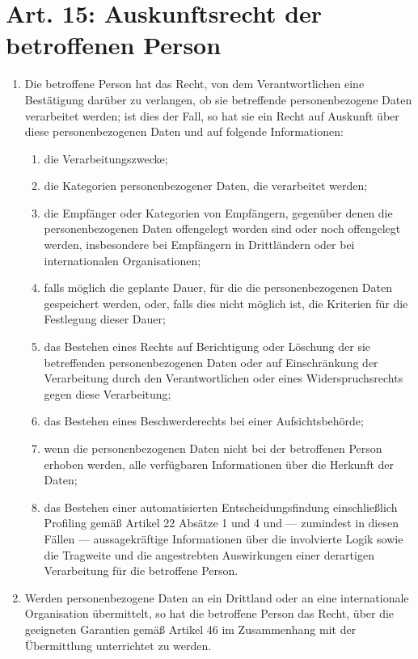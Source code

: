 \documentclass[A4, 12pt]{scrbook}
\begin{document}
    \section[Art. 15: Auskunftsrecht]{Art. 15: Auskunftsrecht der betroffenen Person}
        \begin{enumerate}[label=(\arabic*)]
            \item Die betroffene Person hat das Recht, von dem Verantwortlichen eine Bestätigung darüber zu verlangen, ob sie betreffende personenbezogene Daten verarbeitet werden; ist dies der Fall, so hat sie ein Recht auf Auskunft über diese personenbezogenen Daten und auf folgende Informationen:
                \begin{enumerate}[label=\alph*)]
                    \item die Verarbeitungszwecke;
                    \item die Kategorien personenbezogener Daten, die verarbeitet werden;
                    \item die Empfänger oder Kategorien von Empfängern, gegenüber denen die personenbezogenen Daten offengelegt worden sind oder noch offengelegt werden, insbesondere bei Empfängern in Drittländern oder bei internationalen Organisationen;
                    \item falls möglich die geplante Dauer, für die die personenbezogenen Daten gespeichert werden, oder, falls dies nicht möglich ist, die Kriterien für die Festlegung dieser Dauer;
                    \item das Bestehen eines Rechts auf Berichtigung oder Löschung der sie betreffenden personenbezogenen Daten oder auf Einschränkung der Verarbeitung durch den Verantwortlichen oder eines Widerspruchsrechts gegen diese Verarbeitung;
                    \item das Bestehen eines Beschwerderechts bei einer Aufsichtsbehörde;
                    \item wenn die personenbezogenen Daten nicht bei der betroffenen Person erhoben werden, alle verfügbaren Informationen über die Herkunft der Daten;
                    \item das Bestehen einer automatisierten Entscheidungsfindung einschließlich Profiling gemäß Artikel 22 Absätze 1 und 4 und — zumindest in diesen Fällen — aussagekräftige Informationen über die involvierte Logik sowie die Tragweite und die angestrebten Auswirkungen einer derartigen Verarbeitung für die betroffene Person.
                \end{enumerate}
            \item Werden personenbezogene Daten an ein Drittland oder an eine internationale Organisation übermittelt, so hat die betroffene Person das Recht, über die geeigneten Garantien gemäß Artikel 46 im Zusammenhang mit der Übermittlung unterrichtet zu werden.

\end{enumerate}
\end{document}
